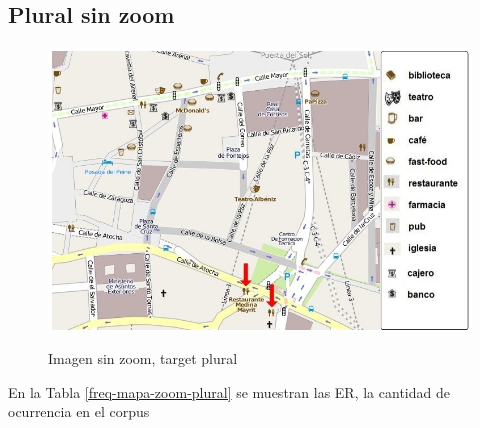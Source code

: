 


\subsection{Plural sin zoom}
\label{sec:plural}
\begin{figure}[H]
\centering
\includegraphics[width=\textwidth]{images/corpus/mapa10.png}\\[0pt]
\caption{Imagen sin zoom, target plural}
\label{mapa-zoom-plural}
\end{figure}

En la Tabla \ref{freq-mapa-zoom-plural} se muestran las ER, la cantidad de ocurrencia en el corpus

